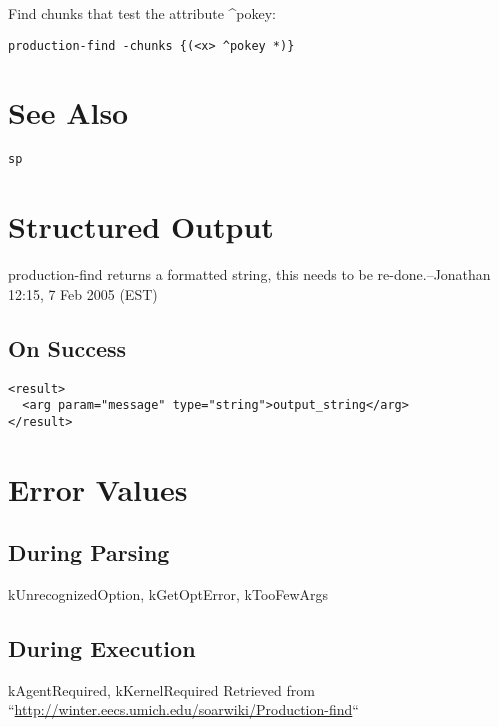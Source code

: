 \documentclass[10pt]{article}
\begin{document}
 Find chunks that test the attribute \^{}pokey: \begin{verbatim}
production-find -chunks {(<x> ^pokey *)}

\end{verbatim}

\section*{ See Also }
\begin{verbatim}
sp

\end{verbatim}
\section*{ Structured Output }


 production-find returns a formatted string, this needs to be re-done.--Jonathan 12:15, 7 Feb 2005 (EST) 
\subsection*{ On Success }
\begin{verbatim}
<result>
  <arg param="message" type="string">output_string</arg>
</result>

\end{verbatim}
\section*{ Error Values }
\subsection*{ During Parsing }


 kUnrecognizedOption, kGetOptError, kTooFewArgs
\subsection*{ During Execution }


 kAgentRequired, kKernelRequired Retrieved from ``\url{http://winter.eecs.umich.edu/soarwiki/Production-find}``
\end{document}
